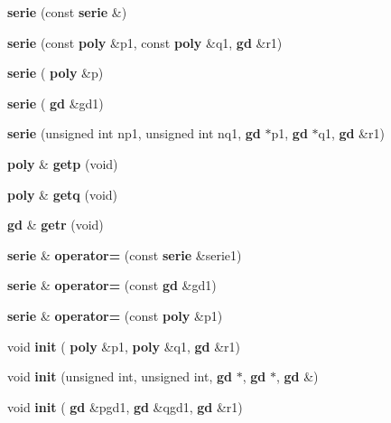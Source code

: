 \begin{DoxyCompactItemize}
\item 
\mbox{\label{classmmgd_1_1serie_aaa97a51daa7e06a231be806a84bd6073}} 
{\bfseries serie} (const \textbf{ serie} \&)
\item 
\mbox{\label{classmmgd_1_1serie_a2e5e176ba9944ac572e1999018e44886}} 
{\bfseries serie} (const \textbf{ poly} \&p1, const \textbf{ poly} \&q1, \textbf{ gd} \&r1)
\item 
\mbox{\label{classmmgd_1_1serie_a4725a58c8ea4de37d2cdd88dd5b4c914}} 
{\bfseries serie} (\textbf{ poly} \&p)
\item 
\mbox{\label{classmmgd_1_1serie_a33e8a0a46077473352724801e10b3cf6}} 
{\bfseries serie} (\textbf{ gd} \&gd1)
\item 
\mbox{\label{classmmgd_1_1serie_af3813bfd7099de4e1b0493dc310bd3fc}} 
{\bfseries serie} (unsigned int np1, unsigned int nq1, \textbf{ gd} $\ast$p1, \textbf{ gd} $\ast$q1, \textbf{ gd} \&r1)
\item 
\mbox{\label{classmmgd_1_1serie_a38fbdc0f684b65730903fcc2a75c2e06}} 
\textbf{ poly} \& {\bfseries getp} (void)
\item 
\mbox{\label{classmmgd_1_1serie_a67c4d214b2e02022f54ff8ff63e657f9}} 
\textbf{ poly} \& {\bfseries getq} (void)
\item 
\mbox{\label{classmmgd_1_1serie_a0650364b2ecc501864fa6e684053aa57}} 
\textbf{ gd} \& {\bfseries getr} (void)
\item 
\mbox{\label{classmmgd_1_1serie_a066f2b3c24ff28b1b771040c7e01166e}} 
\textbf{ serie} \& {\bfseries operator=} (const \textbf{ serie} \&serie1)
\item 
\mbox{\label{classmmgd_1_1serie_a2f14a188cfab4354429d9f0f87a82e58}} 
\textbf{ serie} \& {\bfseries operator=} (const \textbf{ gd} \&gd1)
\item 
\mbox{\label{classmmgd_1_1serie_a21cca4fee933ae71f605215b13a612ae}} 
\textbf{ serie} \& {\bfseries operator=} (const \textbf{ poly} \&p1)
\item 
\mbox{\label{classmmgd_1_1serie_a3ec7bfdba701b17e56c055e0a9486b6e}} 
void {\bfseries init} (\textbf{ poly} \&p1, \textbf{ poly} \&q1, \textbf{ gd} \&r1)
\item 
\mbox{\label{classmmgd_1_1serie_ac01a3e0aea64486c264500293c6313d6}} 
void {\bfseries init} (unsigned int, unsigned int, \textbf{ gd} $\ast$, \textbf{ gd} $\ast$, \textbf{ gd} \&)
\item 
\mbox{\label{classmmgd_1_1serie_a15d0c0636e2cf65ee8af81def95d0242}} 
void {\bfseries init} (\textbf{ gd} \&pgd1, \textbf{ gd} \&qgd1, \textbf{ gd} \&r1)

\end{DoxyCompactItemize}

